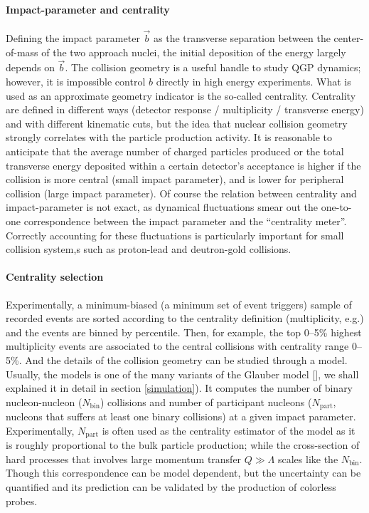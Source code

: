 \paragraph{Impact-parameter and centrality} Defining the impact parameter $\vec{b}$ as the transverse separation between the center-of-mass of the two approach nuclei,
the initial deposition of the energy largely depends on $\vec{b}$.
The collision geometry is a useful handle to study QGP dynamics; however,
it is impossible control $b$ directly in high energy experiments.
What is used as an approximate geometry indicator is the so-called centrality.
Centrality are defined in different ways (detector response / multiplicity / transverse energy) and with different kinematic cuts, but the idea that  nuclear collision geometry strongly correlates with the particle production activity.
It is reasonable to anticipate that the average number of charged particles produced or the total transverse energy deposited within a certain detector's acceptance is higher if the collision is more central (small impact parameter), and is lower for peripheral collision (large impact parameter).
Of course the relation between centrality and impact-parameter is not exact, as dynamical fluctuations smear out the one-to-one correspondence between the impact parameter and the ``centrality meter''.
Correctly accounting for these fluctuations is particularly important for small collision system,s such as proton-lead and deutron-gold collisions.

\paragraph{Centrality selection} Experimentally, a minimum-biased (a minimum set of event triggers) sample of recorded events are sorted according to the centrality definition (multiplicity, e.g.) and the events are binned by percentile.
Then, for example, the top 0--5\% highest multiplicity events are associated to the central collisions with centrality range 0--5\%. 
And the details of the collision geometry can be studied through a model.
Usually, the models is one of the many variants of the Glauber model [], we shall explained it in detail in section \ref{simulation}).
It computes the number of binary nucleon-nucleon ($N_{\textrm{bin}}$) collisions and number of participant nucleons ($N_{\textrm{part}}$, nucleons that suffers at least one binary collisions) at a given impact parameter.
Experimentally, $N_{\textrm{part}}$ is often used as the centrality estimator of the model as it is roughly proportional to the bulk particle production; while the cross-section of hard processes that involves large momentum transfer $Q \gg \Lambda$ scales like the $N_{\textrm{bin}}$.
Though this correspondence can be model dependent, but the uncertainty can be quantified and its prediction can be validated by the production of colorless probes.


